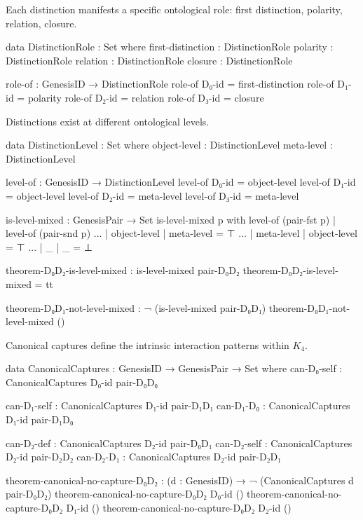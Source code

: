 \documentclass[11pt,a4paper]{book}
\begin{document}
Each distinction manifests a specific ontological role: first distinction, polarity, relation, closure.

\begin{code}
data DistinctionRole : Set where
  first-distinction : DistinctionRole
  polarity         : DistinctionRole
  relation         : DistinctionRole
  closure          : DistinctionRole

role-of : GenesisID → DistinctionRole
role-of D₀-id = first-distinction
role-of D₁-id = polarity
role-of D₂-id = relation
role-of D₃-id = closure
\end{code}

Distinctions exist at different ontological levels.

\begin{code}
data DistinctionLevel : Set where
  object-level : DistinctionLevel
  meta-level   : DistinctionLevel

level-of : GenesisID → DistinctionLevel
level-of D₀-id = object-level
level-of D₁-id = object-level  
level-of D₂-id = meta-level
level-of D₃-id = meta-level

is-level-mixed : GenesisPair → Set
is-level-mixed p with level-of (pair-fst p) | level-of (pair-snd p)
... | object-level | meta-level = ⊤
... | meta-level | object-level = ⊤
... | _ | _ = ⊥

theorem-D₀D₂-is-level-mixed : is-level-mixed pair-D₀D₂
theorem-D₀D₂-is-level-mixed = tt

theorem-D₀D₁-not-level-mixed : ¬ (is-level-mixed pair-D₀D₁)
theorem-D₀D₁-not-level-mixed ()

\end{code}

Canonical captures define the intrinsic interaction patterns within $K_4$.

\begin{code}
data CanonicalCaptures : GenesisID → GenesisPair → Set where
  can-D₀-self : CanonicalCaptures D₀-id pair-D₀D₀
  
  can-D₁-self : CanonicalCaptures D₁-id pair-D₁D₁
  can-D₁-D₀   : CanonicalCaptures D₁-id pair-D₁D₀
  
  can-D₂-def  : CanonicalCaptures D₂-id pair-D₀D₁
  can-D₂-self : CanonicalCaptures D₂-id pair-D₂D₂
  can-D₂-D₁   : CanonicalCaptures D₂-id pair-D₂D₁

theorem-canonical-no-capture-D₀D₂ : (d : GenesisID) → ¬ (CanonicalCaptures d pair-D₀D₂)
theorem-canonical-no-capture-D₀D₂ D₀-id ()
theorem-canonical-no-capture-D₀D₂ D₁-id ()
theorem-canonical-no-capture-D₀D₂ D₂-id ()
\end{code}
\end{document}
